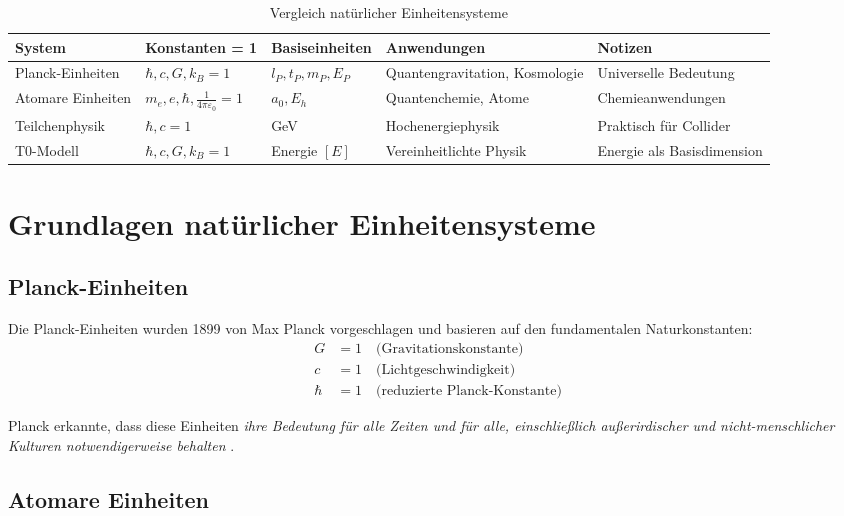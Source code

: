 	\begin{table}[htbp]
		\centering
		\begin{adjustbox}{width=0.95\textwidth}
			\begin{tabular}{lllll}
				\toprule
				\textbf{System} & \textbf{Konstanten = 1} & \textbf{Basiseinheiten} & \textbf{Anwendungen} & \textbf{Notizen} \\
				\midrule
				Planck-Einheiten & $\hbar, c, G, k_B = 1$ & $l_P, t_P, m_P, E_P$ & Quantengravitation, Kosmologie & Universelle Bedeutung \\
				Atomare Einheiten & $m_e, e, \hbar, \frac{1}{4\pi\varepsilon_0} = 1$ & $a_0, E_h$ & Quantenchemie, Atome & Chemieanwendungen \\
				Teilchenphysik & $\hbar, c = 1$ & GeV & Hochenergiephysik & Praktisch für Collider \\
				T0-Modell & $\hbar, c, G, k_B = 1$ & Energie $[E]$ & Vereinheitlichte Physik & Energie als Basisdimension \\
				\bottomrule
			\end{tabular}
		\end{adjustbox}
		\caption{Vergleich natürlicher Einheitensysteme}
		\label{tab:einheitensysteme}
	\end{table}
	
	\section{Grundlagen natürlicher Einheitensysteme}
	
	\subsection{Planck-Einheiten}
	
	Die Planck-Einheiten wurden 1899 von Max Planck vorgeschlagen \cite{planck1900,planck1906} und basieren auf den fundamentalen Naturkonstanten:
	\begin{align}
		G &= 1 \quad \text{(Gravitationskonstante)} \\
		c &= 1 \quad \text{(Lichtgeschwindigkeit)} \\
		\hbar &= 1 \quad \text{(reduzierte Planck-Konstante)}
	\end{align}
	
	Planck erkannte, dass diese Einheiten \textit{ihre Bedeutung für alle Zeiten und für alle, einschließlich außerirdischer und nicht-menschlicher Kulturen notwendigerweise behalten} \cite{planck1900}.
	
	\subsection{Atomare Einheiten}
	
